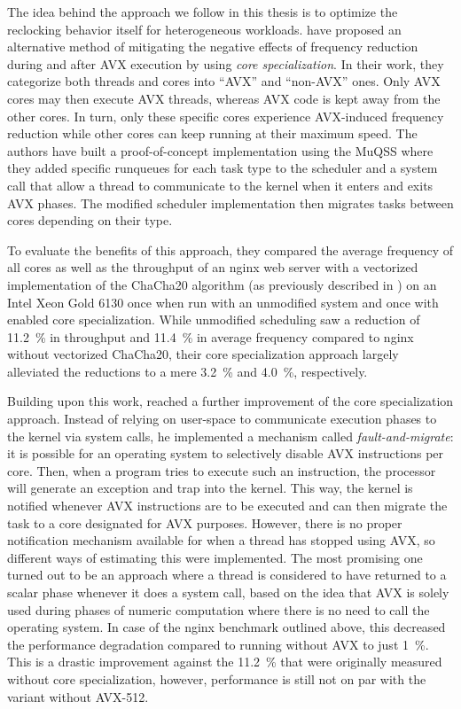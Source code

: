{The idea behind the approach we follow in this thesis is to optimize the reclocking behavior itself for heterogeneous workloads. \citeauthor{gottschlag19sfma} \cite{gottschlag19sfma} have proposed an alternative method of mitigating the negative effects of frequency reduction during and after \gls{AVX} execution by using \emph{core specialization}. In their work, they categorize both threads and cores into \enquote{AVX} and \enquote{non-AVX} ones. Only AVX cores may then execute AVX threads, whereas AVX code is kept away from the other cores. In turn, only these specific cores experience \gls{AVX}-induced frequency reduction while other cores can keep running at their maximum speed. The authors have built a proof-of-concept implementation using the \gls{MuQSS} where they added specific runqueues for each task type to the scheduler and a system call that allow a thread to communicate to the kernel when it enters and exits \gls{AVX} phases. The modified scheduler implementation then migrates tasks between cores depending on their type.

To evaluate the benefits of this approach, they compared the average frequency of all cores as well as the throughput of an nginx web server with a vectorized implementation of the ChaCha20 algorithm (as previously described in ) on an Intel Xeon Gold 6130 once when run with an unmodified system and once with enabled core specialization. While unmodified scheduling saw a reduction of \SI{11.2}{\percent} in throughput and \SI{11.4}{\percent} in average frequency compared to nginx without vectorized ChaCha20, their core specialization approach largely alleviated the reductions to a mere \SI{3.2}{\percent} and \SI{4.0}{\percent}, respectively.

Building upon this work, \citeauthor{brantsch19corespecialization} \cite{brantsch19corespecialization} reached a further improvement of the core specialization approach. Instead of relying on user-space to communicate execution phases to the kernel via system calls, he implemented a mechanism called \emph{fault-and-migrate}: it is possible for an operating system to selectively disable \gls{AVX} instructions per core. Then, when a program tries to execute such an instruction, the processor will generate an exception and trap into the kernel. This way, the kernel is notified whenever \gls{AVX} instructions are to be executed and can then migrate the task to a core designated for \gls{AVX} purposes. However, there is no proper notification mechanism available for when a thread has stopped using \gls{AVX}, so different ways of estimating this were implemented. The most promising one turned out to be an approach where a thread is considered to have returned to a scalar phase whenever it does a system call, based on the idea that \gls{AVX} is solely used during phases of numeric computation where there is no need to call the operating system. In case of the nginx benchmark outlined above, this decreased the performance degradation compared to running without \gls{AVX} to just \SI{1}{\percent}. This is a drastic improvement against the \SI{11.2}{\percent} that were originally measured without core specialization, however, performance is still not on par with the variant without \gls{AVX-512}.

}
